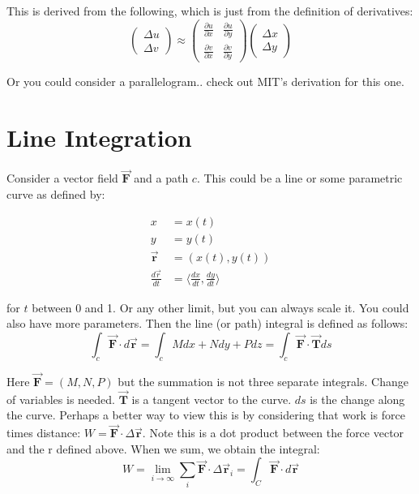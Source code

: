 \documentclass{article}
\newcommand{\der}{\partial}
\newcommand{\vf}[1]{\vec{\mathbf{#1}}}
\begin{document}
This is derived from the following, which is just from the definition of derivatives:
\begin{equation*}
    \begin{pmatrix}\Delta u \\ \Delta v\end{pmatrix} \approx 
        \begin{pmatrix}
            \frac{\der u}{\der x} & \frac{\der u}{\der y} \\
             \frac{\der v}{\der x} & \frac{\der v}{\der y}
        \end{pmatrix}
        \begin{pmatrix} \Delta x \\ \Delta y \end{pmatrix}
\end{equation*}

Or you could consider a parallelogram.. check out MIT's derivation for this one.

\section{Line Integration}
Consider a vector field $\vec{\mathbf{F}}$ and a path $c$. This could be a line or some parametric curve as defined by:

\begin{align}
    x &= x(t) \\
    y &= y(t) \\
    \vf{r} &= (x(t), y(t)) \\
    \frac{d\vec{r}}{dt} &= \langle \frac{dx}{dt}, \frac{dy}{dt} \rangle
\end{align}

for $t$ between 0 and 1. Or any other limit, but you can always scale it. You could also have more parameters.
\vskip 0.1in
Then the line (or path) integral is defined as follows:
\begin{equation*}
    \int_c \vf{F} \cdot d\vf{r} =
        \int_c Mdx + Ndy + Pdz = \int_c \vf{F} \cdot \vf{T} ds
\end{equation*}

Here $\vf{F} = (M, N, P)$ but the summation is not three separate integrals. Change of variables is needed. $\vf{T}$ is a tangent vector to the curve. $ds$ is the change along the curve.
\vskip 0.1in
Perhaps a better way to view this is by considering that work is force times distance: $W = \vf{F} \cdot \Delta \vf{r}$. Note this is a dot product between the force vector and the r defined above. When we sum, we obtain the integral:
\begin{equation}
    W = \lim_{i \to \infty} \sum_i \vf{F} \cdot \Delta \vf{r}_i = \int_C \vf{F} \cdot d\vf{r}
\end{equation}
\end{document}

